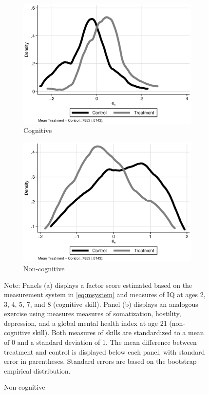 \begin{figure}[H]
\centering
\caption{Estimates of Cognitive ($\theta_{c}^d$) and Non-cognitive Skills ($\theta_{n}^d$)}\label{figure:factors}
\begin{subfigure}[h]{0.7\textwidth}
		\centering
		\caption{Cognitive} \label{fig:c}
		\includegraphics[width=\textwidth]{output/abccare_cfactor.eps}
\end{subfigure}

\begin{subfigure}[h]{0.7\textwidth}
	\centering
	\caption{Non-cognitive} \label{fig:n}
		\includegraphics[width=\textwidth]{output/abccare_nfactor.eps}
\end{subfigure}
\footnotesize \justify
Note: Panels (a) displays a factor score estimated based on the measurement system in \eqref{eq:msystem} and measures of IQ at ages 2, 3, 4, 5, 7, and 8 (cognitive skill). Panel (b) displays an analogous exercise using measures measures of somatization, hostility, depression, and a global mental health index at age 21 (non-cognitive skill). Both measures of skills are standardized to a mean of $0$ and a standard deviation of $1$. The mean difference between treatment and control is displayed below each panel, with standard error in parentheses. Standard errors are based on the bootstrap empirical distribution.
\end{figure}

